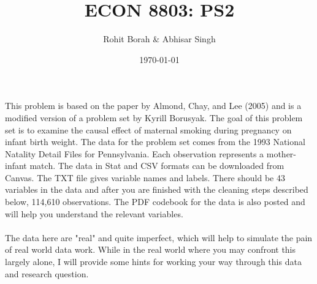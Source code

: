 \documentclass{article}
\title{ECON 8803: PS2}
\author{Rohit Borah \& Abhisar Singh}
\date{\today}
\begin{document}
\maketitle

\noindent This problem is based on the paper by Almond, Chay, and Lee (2005) and is a modified version of a problem set by Kyrill Borusyak. The goal of this problem set is to examine the causal effect of maternal smoking during pregnancy on infant birth weight. The data for the problem set comes from the 1993 National Natality Detail Files for Pennsylvania. Each observation represents a mother-infant match. The data in Stat and CSV formats can be downloaded from Canvas. The TXT file gives variable names and labels. There should be 43 variables in the data and after you are finished with the cleaning steps described below, 114,610 observations. The PDF codebook for the data is also posted and will help you understand the relevant variables.\\\\
The data here are "real" and quite imperfect, which will help to simulate the pain of real world data work. While in the real world where you may confront this largely alone, I will provide some hints for working your way through this data and research question.
\end{document}
